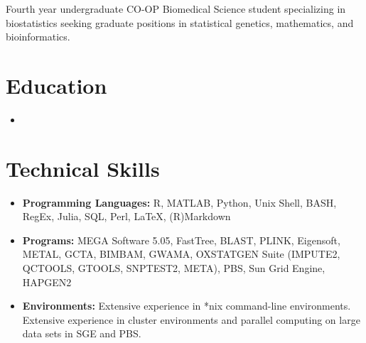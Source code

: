 \documentclass[11pt,a4paper,sans]{moderncv}        %
\begin{document}
\makecvtitle

\small{Fourth year undergraduate CO-OP Biomedical Science student specializing in biostatistics seeking graduate positions in statistical genetics, mathematics, and bioinformatics.}


\section{Education}

\vspace{4pt}

\begin{itemize}

\item{}

\end{itemize}


\section{Technical Skills}

\vspace{6pt}

\begin{itemize}

\item \textbf{Programming Languages:} R, MATLAB, Python, Unix Shell, BASH, RegEx, Julia, SQL, Perl, \LaTeX, (R)Markdown

\vspace{6pt}

\item \textbf{Programs:} MEGA Software 5.05, FastTree, BLAST, PLINK, Eigensoft, METAL, GCTA, BIMBAM, GWAMA, OXSTATGEN Suite (IMPUTE2, QCTOOLS, GTOOLS, SNPTEST2, META), PBS, Sun Grid Engine, HAPGEN2


\vspace{6pt}

\item \textbf{Environments:} Extensive experience in *nix command-line environments. Extensive experience in cluster environments and parallel computing on large data sets in SGE and PBS. 

\end{itemize}
\end{document}
